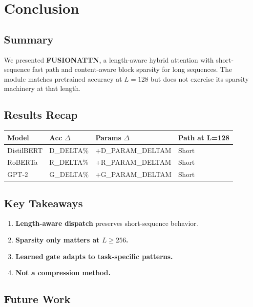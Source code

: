 \section{Conclusion}

\subsection{Summary}

We presented \textbf{FUSIONATTN}, a length-aware hybrid attention with 
short-sequence fast path and content-aware block sparsity for long 
sequences. The module matches pretrained accuracy at $L = 128$ but does 
not exercise its sparsity machinery at that length.

\subsection{Results Recap}

\begin{table}[H]
\centering
\small
\begin{tabular}{llll}
\toprule
\textbf{Model} & \textbf{Acc $\Delta$} & \textbf{Params $\Delta$} & \textbf{Path at L=128} \\
\midrule
DistilBERT & {{D\_DELTA}}\% & +{{D\_PARAM\_DELTA}}M & Short \\
RoBERTa & {{R\_DELTA}}\% & +{{R\_PARAM\_DELTA}}M & Short \\
GPT-2 & {{G\_DELTA}}\% & +{{G\_PARAM\_DELTA}}M & Short \\
\bottomrule
\end{tabular}
\end{table}

\subsection{Key Takeaways}

\begin{enumerate}
\item \textbf{Length-aware dispatch} preserves short-sequence behavior.
\item \textbf{Sparsity only matters at $L \geq 256$.}
\item \textbf{Learned gate adapts to task-specific patterns.}
\item \textbf{Not a compression method.}

\end{enumerate}
\subsection{Future Work}


